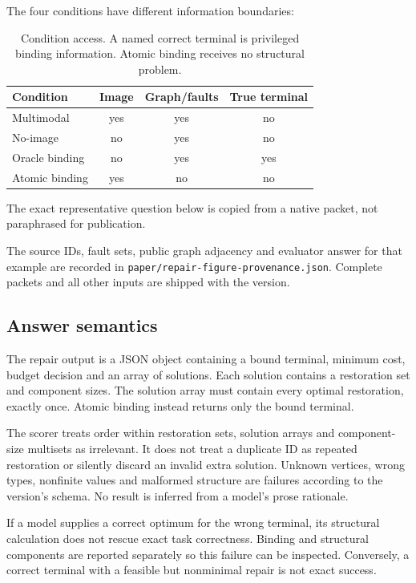\documentclass[10pt,twocolumn,letterpaper]{article}
\begin{document}
The four conditions have different information boundaries:

\begin{table}[H]
\centering\small
\caption{Condition access. A named correct terminal is privileged
binding information. Atomic binding receives no structural problem.}
\begin{tabular}{@{}lccc@{}}
\toprule
Condition & Image & Graph/faults & True terminal\\
\midrule
Multimodal & yes & yes & no\\
No-image & no & yes & no\\
Oracle binding & no & yes & yes\\
Atomic binding & yes & no & no\\
\bottomrule
\end{tabular}
\end{table}

The exact representative question below is copied from a native
packet, not paraphrased for publication.
\begin{quote}\small

\end{quote}
The source IDs, fault sets, public graph adjacency and evaluator
answer for that example are recorded in
\texttt{paper/repair-figure-provenance.json}. Complete packets and
all other inputs are shipped with the version.

\subsection{Answer semantics}
The repair output is a JSON object containing a bound terminal,
minimum cost, budget decision and an array of solutions.
Each solution contains a restoration set and component sizes.
The solution array must contain every optimal restoration, exactly
once. Atomic binding instead returns only the bound terminal.


The scorer treats order within restoration sets, solution arrays and
component-size multisets as irrelevant. It does not treat a duplicate
ID as repeated restoration or silently discard an invalid extra
solution. Unknown vertices, wrong types, nonfinite values and
malformed structure are failures according to the version's schema.
No result is inferred from a model's prose rationale.

If a model supplies a correct optimum for the wrong terminal, its
structural calculation does not rescue exact task correctness.
Binding and structural components are reported separately so this
failure can be inspected. Conversely, a correct terminal with a
feasible but nonminimal repair is not exact success.
\end{document}
